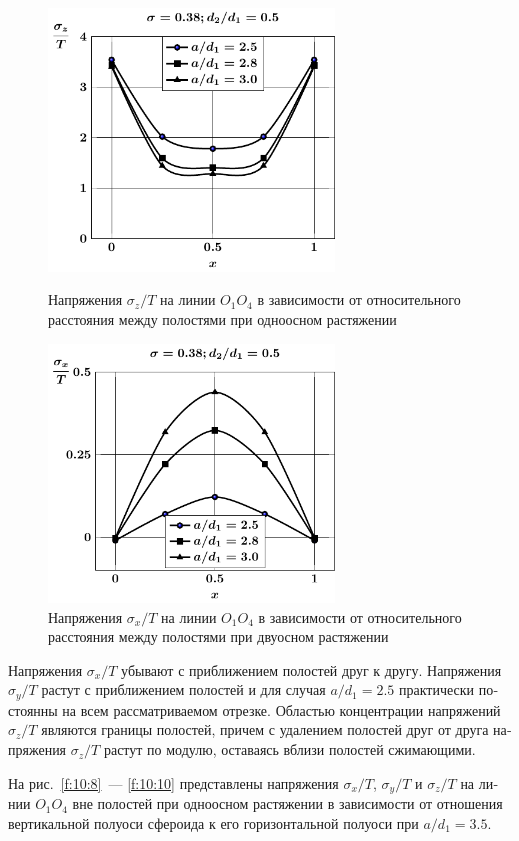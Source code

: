 \begin{russian}
\begin{figure}[h!]
\centering\footnotesize
\parbox[b]{7.5cm}{\centering\includegraphics[width=7.6cm]{cav4-oblate-a-d50-t1-sig_z.pdf}
\caption{Напряжения $\sigma_z/T$ на линии $O_1O_4$ в зависимости от относительного расстояния между полостями при одноосном растяжении
\label{f:10:4}}}\hfil\hfil
\parbox[b]{7.5cm}{\centering\includegraphics[width=7.6cm]{cav4-oblate-a-d50-t2-sig_x.pdf}
\caption{Напряжения $\sigma_x/T$ на линии $O_1O_4$ в зависимости от относительного расстояния между полостями при двуосном растяжении
\label{f:10:5}}}
\end{figure}

Напряжения $\sigma_x/T$ убывают с приближением полостей друг к другу. Напряжения $\sigma_y/T$ растут с приближением полостей и для случая $a/d_1=2.5$ практически постоянны на всем рассматриваемом отрезке. Областью концентрации напряжений $\sigma_z/T$ являются границы полостей, причем с удалением полостей друг от друга напряжения $\sigma_z/T$ растут по модулю, оставаясь вблизи полостей сжимающими.

На рис.~\ref{f:10:8}~--- \ref{f:10:10} представлены напряжения $\sigma_x/T$, $\sigma_y/T$ и $\sigma_z/T$ на линии $O_1O_4$ вне полостей при одноосном растяжении в зависимости от отношения вертикальной полуоси сфероида к его горизонтальной полуоси при $a/d_1=3.5$.


\end{russian}
